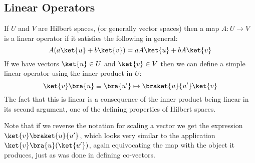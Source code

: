\subsection{Linear Operators}
If $U$ and $V$ are Hilbert spaces, (or generally vector spaces) then a map $A: U \to V$ is a linear operator if it satisfies the following in general:
\[A(a\ket{u} + b\ket{v}) = aA\ket{u} + bA\ket{v}\]
If we have vectors $\ket{u} \in U$ and $\ket{v} \in V$ then we can define a simple linear operator using the inner product in $U$:
\[\ket{v}\bra{u} \equiv \bra{u'} \mapsto \braket{u}{u'}\ket{v}\]
The fact that this is linear is a consequence of the inner product being linear in its second argument, one of the defining properties of Hilbert spaces.

Note that if we reverse the notation for scaling a vector we get the expression $\ket{v}\braket{u}{u'}$, which looks very similar to the application $\ket{v}\bra{u}(\ket{u'})$, again equivocating the map with the object it produces, just as was done in defining co-vectors.

